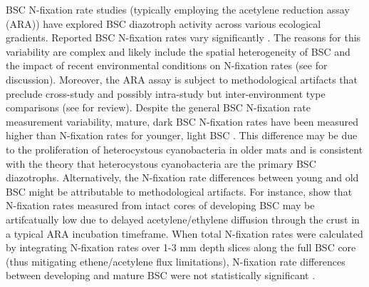 BSC N-fixation rate studies (typically employing the acetylene reduction assay
(ARA)) have explored BSC diazotroph activity across various ecological
gradients. Reported BSC N-fixation rates vary significantly \citep{Evans_2001}.
The reasons for this variability are complex and likely include the spatial
heterogeneity of BSC \citep{Evans_2001} and the impact of recent environmental
conditions on N-fixation rates (see \citet{Belnap_2001} for discussion).
Moreover, the ARA assay is subject to methodological artifacts that preclude
cross-study and possibly intra-study but inter-environment type comparisons
(see \citet{Belnap_2001} for review). Despite the general BSC N-fixation rate
measurement variability, mature, dark BSC N-fixation rates have been measured
higher than N-fixation rates for younger, light BSC \citep{Belnap_2002,
14766579}. This difference may be due to the proliferation of heterocystous
cyanobacteria in older mats and is consistent with the theory that
heterocystous cyanobacteria are the primary BSC diazotrophs. Alternatively, the
N-fixation rate differences between young and old BSC might be attributable to
methodological artifacts. For instance, \citet{15643930} show that N-fixation
rates measured from intact cores of developing BSC may be artifcatually low due
to delayed acetylene/ethylene diffusion through the crust in a typical ARA
incubation timeframe. When total N-fixation rates were calculated by
integrating N-fixation rates over 1-3 mm depth slices along the full
BSC core (thus mitigating ethene/acetylene flux limitations), N-fixation rate
differences between developing and mature BSC were not statistically significant
\citep{15643930}.

